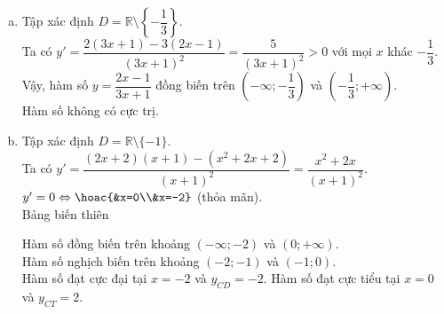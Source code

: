 \begin{bt}
{\begin{enumerate}[a) ]
			\item Tập xác định $D=\mathbb{R}\setminus \left\{-\dfrac{1}{3}\right\}$.\\
			Ta có $y'=\dfrac{2(3x+1)-3(2x-1)}{(3x+1)^2}=\dfrac{5}{(3x+1)^2}>0$ với mọi $x$ khác $- \dfrac{1}{3}$. \\ 
			Vậy, hàm số $y=\dfrac{2x-1}{3x+1}$ đồng biến trên $\left(-\infty; - \dfrac{1}{3}\right)$ và $\left(- \dfrac{1}{3};+\infty\right)$.\\
			Hàm số không có cực trị.
			\item Tập xác định $D=\mathbb{R}\setminus \{-1\}$.\\
			Ta có $y'=\dfrac{(2x+2)(x+1)-(x^2+2x+2)}{(x+1)^2}=\dfrac{x^2+2x}{(x+1)^2}$. \\ 
			$y'=0\Leftrightarrow \hoac{&x=0\\&x=-2}$ (thỏa mãn). \\
			Bảng biến thiên 
			\begin{center}
			\end{center}
			Hàm số đồng biến trên khoảng $\left(-\infty;-2 \right)$ và $\left(0;+\infty \right)$. \\ 
			Hàm số nghịch biến trên khoảng $\left(-2;-1 \right)$ và $\left(-1;0 \right)$.\\
			Hàm số đạt cực đại tại $x=-2$ và $y_{CD}=-2$. Hàm số đạt cực tiểu tại $x=0$ và $y_{CT}=2$.
		\end{enumerate}
	}
\end{bt}

